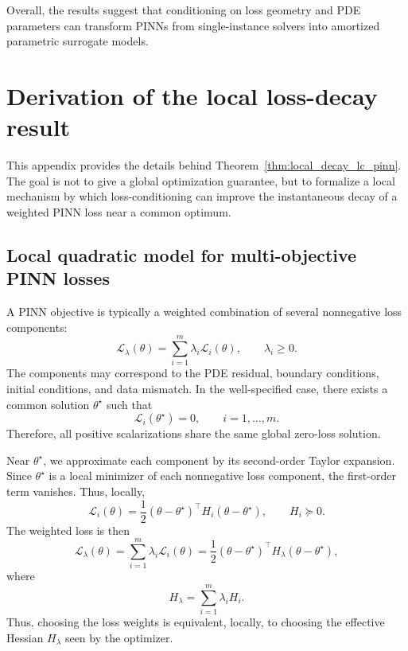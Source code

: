 \documentclass{article}
\theoremstyle{plain}
\theoremstyle{definition}
\theoremstyle{remark}
\begin{document}
Overall, the results suggest that conditioning on loss geometry and PDE parameters can transform PINNs from single-instance solvers into amortized parametric surrogate models.




\newpage
\appendix
\onecolumn
\section{Derivation of the local loss-decay result}
\label{app:local_decay_lc_pinn}

This appendix provides the details behind
Theorem~\ref{thm:local_decay_lc_pinn}. The goal is not to give a global
optimization guarantee, but to formalize a local mechanism by which
loss-conditioning can improve the instantaneous decay of a weighted PINN
loss near a common optimum.

\subsection{Local quadratic model for multi-objective PINN losses}

A PINN objective is typically a weighted combination of several
nonnegative loss components:
\[
    \mathcal{L}_{\lambda}(\theta)
    =
    \sum_{i=1}^m \lambda_i \mathcal{L}_i(\theta),
    \qquad
    \lambda_i \geq 0 .
\]
The components may correspond to the PDE residual, boundary conditions,
initial conditions, and data mismatch. In the well-specified case, there
exists a common solution $\theta^\star$ such that
\[
    \mathcal{L}_i(\theta^\star)=0,
    \qquad
    i=1,\dots,m .
\]
Therefore, all positive scalarizations share the same global zero-loss
solution.

Near $\theta^\star$, we approximate each component by its second-order
Taylor expansion. Since $\theta^\star$ is a local minimizer of each
nonnegative loss component, the first-order term vanishes. Thus,
locally,
\[
    \mathcal{L}_i(\theta)
    =
    \frac12
    (\theta-\theta^\star)^\top
    H_i
    (\theta-\theta^\star),
    \qquad
    H_i \succeq 0 .
\]
The weighted loss is then
\[
    \mathcal{L}_{\lambda}(\theta)
    =
    \sum_{i=1}^m \lambda_i \mathcal{L}_i(\theta)
    =
    \frac12
    (\theta-\theta^\star)^\top
    H_\lambda
    (\theta-\theta^\star),
\]
where
\[
    H_\lambda
    =
    \sum_{i=1}^m \lambda_i H_i .
\]
Thus, choosing the loss weights is equivalent, locally, to choosing the
effective Hessian $H_\lambda$ seen by the optimizer.
\end{document}
